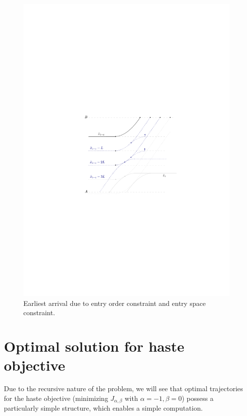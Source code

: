 \documentclass[a4paper]{report}
\theoremstyle{definition}
\theoremstyle{plain}
\begin{document}
\begin{figure}
  \centering
  \includegraphics[scale=1]{figures/motion/earliest-arrival}
 \caption{Earliest arrival due to entry order constraint and entry space constraint.}%
\end{figure}



\newpage

\section{Optimal solution for haste objective}\label{sec:explicit-trajectories}

Due to the recursive nature of the problem, we will see that optimal
trajectories for the haste objective (minimizing $J_{\alpha,\beta}$ with
$\alpha=-1,\beta=0$) possess a particularly simple structure, which enables a
simple computation.
\end{document}
